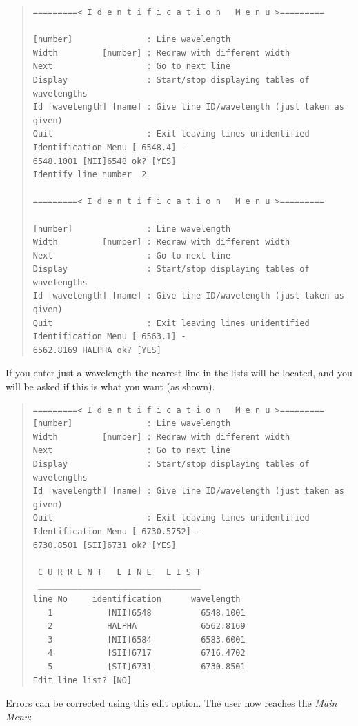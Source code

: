 \documentclass[11pt,twoside]{article}
\begin{document}
\begin{quote}\begin{verbatim}
=========< I d e n t i f i c a t i o n   M e n u >=========

[number]               : Line wavelength
Width         [number] : Redraw with different width
Next                   : Go to next line
Display                : Start/stop displaying tables of wavelengths
Id [wavelength] [name] : Give line ID/wavelength (just taken as given)
Quit                   : Exit leaving lines unidentified
Identification Menu [ 6548.4] -
6548.1001 [NII]6548 ok? [YES]
Identify line number  2

=========< I d e n t i f i c a t i o n   M e n u >=========

[number]               : Line wavelength
Width         [number] : Redraw with different width
Next                   : Go to next line
Display                : Start/stop displaying tables of wavelengths
Id [wavelength] [name] : Give line ID/wavelength (just taken as given)
Quit                   : Exit leaving lines unidentified
Identification Menu [ 6563.1] -
6562.8169 HALPHA ok? [YES]
\end{verbatim}\end{quote}

If you enter just a wavelength the nearest line in the lists will be
located, and you will be asked if this is what you want (as shown).

\begin{quote}\begin{verbatim}
=========< I d e n t i f i c a t i o n   M e n u >=========
[number]               : Line wavelength
Width         [number] : Redraw with different width
Next                   : Go to next line
Display                : Start/stop displaying tables of wavelengths
Id [wavelength] [name] : Give line ID/wavelength (just taken as given)
Quit                   : Exit leaving lines unidentified
Identification Menu [ 6730.5752] -
6730.8501 [SII]6731 ok? [YES]

 C U R R E N T   L I N E   L I S T
 _________________________________
line No     identification      wavelength
   1           [NII]6548          6548.1001
   2           HALPHA             6562.8169
   3           [NII]6584          6583.6001
   4           [SII]6717          6716.4702
   5           [SII]6731          6730.8501
Edit line list? [NO]
\end{verbatim}\end{quote}

Errors can be corrected using this edit option.
The user now reaches the {\it Main Menu}:
\end{document}
